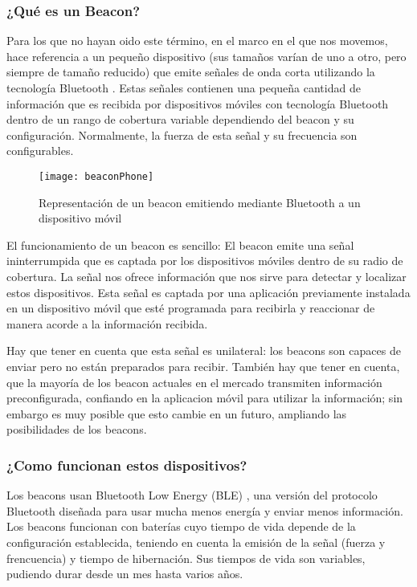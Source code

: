 \subsubsection{¿Qué es un Beacon?}

Para los que no hayan oido este término, en el marco en el que nos movemos, hace referencia a un pequeño dispositivo (sus tamaños varían de uno a otro, pero siempre de tamaño reducido) que emite señales de onda corta utilizando la tecnología Bluetooth \cite{URL::Bluetooth}. Estas señales contienen una pequeña cantidad de información que es recibida por dispositivos móviles con tecnología Bluetooth dentro de un rango de cobertura variable dependiendo del beacon y su configuración. Normalmente, la fuerza de esta señal y su frecuencia son configurables.

\begin{figure}[h]
	\centering
	\texttt{[image: beaconPhone]}
	\caption{Representación de un beacon emitiendo mediante Bluetooth a un dispositivo móvil}
	\label{fig:beaconBluetooth}
\end{figure}

El funcionamiento de un beacon es sencillo: El beacon emite una señal ininterrumpida que es captada por los dispositivos móviles dentro de su radio de cobertura. La señal nos ofrece información que nos sirve para detectar y localizar estos dispositivos. Esta señal es captada por una aplicación previamente instalada en un dispositivo móvil que esté programada para recibirla y reaccionar de manera acorde a la información recibida.


Hay que tener en cuenta que esta señal es unilateral: los beacons son capaces de enviar pero no están preparados para recibir. También hay que tener en cuenta, que la mayoría de los beacon actuales en el mercado transmiten información preconfigurada, confiando en la aplicacion móvil para utilizar la información; sin embargo es muy posible que esto cambie en un futuro, ampliando las posibilidades de los beacons.

\subsubsection{¿Como funcionan estos dispositivos?}

Los beacons usan Bluetooth Low Energy (BLE) \cite{URL::BluetoothLowEnergy}, una versión del protocolo Bluetooth diseñada para usar mucha menos energía y enviar menos información. Los beacons funcionan con baterías cuyo tiempo de vida depende de la configuración establecida, teniendo en cuenta la emisión de la señal (fuerza y frencuencia) y tiempo de hibernación. Sus tiempos de vida son variables, pudiendo durar desde un mes hasta varios años. 


